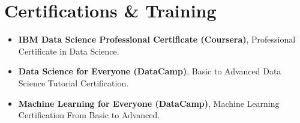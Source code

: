 \section{\textbf{Certifications \& Training}}
\begin{itemize}[leftmargin=*,itemsep=2pt,parsep=0pt]
    \item \textbf{IBM Data Science Professional Certificate (Coursera)}, Professional Certificate in Data Science.
    \item \textbf{Data Science for Everyone (DataCamp)}, Basic to Advanced Data Science Tutorial Certification.
    \item \textbf{Machine Learning for Everyone (DataCamp)}, Machine Learning Certification From Basic to Advanced.
\end{itemize}
